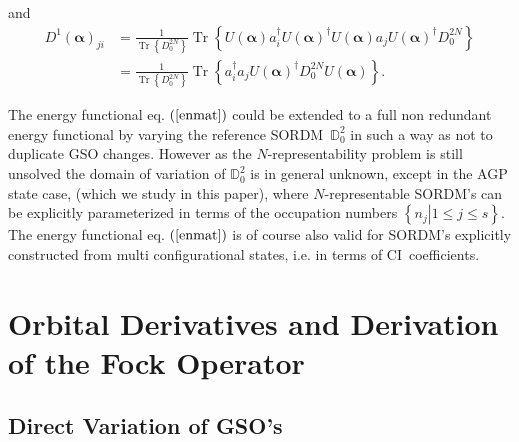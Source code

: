 \documentclass[aps,preprint]{revtex4}%
\begin{document}
and
\begin{align}
D^{1}\left(  \bm{\alpha}\right)  _{ji}  &  =\frac{1}{\operatorname{Tr}\left\{
D_{0}^{2N}\right\}  }\operatorname{Tr}\left\{  U\left(  \bm{\alpha}\right)
a_{i}^{\dagger}U\left(  \bm{\alpha}\right)  ^{\dagger}U\left(
\bm{\alpha}\right)  a_{j}U\left(  \bm{\alpha }\right)  ^{\dagger}D_{0}%
^{2N}\right\} \nonumber\\
&  =\frac{1}{\operatorname{Tr}\left\{  D_{0}^{2N}\right\}  }\operatorname{Tr}%
\left\{  a_{i}^{\dagger}a_{j}U\left(  \bm{\alpha}\right)  ^{\dagger}D_{0}%
^{2N}U\left(  \bm{\alpha}\right)  \right\}  .
\end{align}


The energy functional eq. $\left(  \ref{enmat}\right)  $ could be extended to
a full non redundant energy functional by varying the reference
SORDM\ $\mathbb{D}_{0}^{2}$ in such a way as not to duplicate GSO changes.
However as the $N$-representability problem is still unsolved the domain of
variation of $\mathbb{D}_{0}^{2}$ is in general unknown, except in the AGP
state case, (which we study in this paper), where $N$-representable SORDM's
can be explicitly parameterized in terms of the occupation numbers $\left\{
\left.  n_{j}\right\vert 1\leq j\leq s\right\}  $. The energy functional eq.
$\left(  \ref{enmat}\right)  $ is of course also valid for SORDM's explicitly
constructed from multi configurational states, i.e. in terms of CI\ coefficients.

\section{Orbital Derivatives and Derivation of the Fock
Operator\label{Deriv_Fock}}

\subsection{Direct Variation of GSO's}
\end{document}
